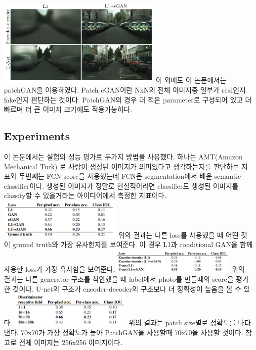 \documentclass[extendedabs]{bmvc2k}
\begin{document}
 \newline  \includegraphics[width=8cm]{images/01_pix2pix.PNG}
 \newline 이 외에도 이 논문에서는 patchGAN을 이용하였다. Patch cGAN이란
 NxN의 전체 이미지중 일부가 real인지 fake인지 판단하는 것이다. PatchGAN의 경우 더 적은 parameter로 구성되어 있고 더 빠르며 더 큰 이미지 크기에도 적용가능하다.
 
 \subsection{Experiments}
 \quad 이 논문에서는 실험의 성능 평가로 두가지 방법을 사용했다. 하나는 AMT(Amazon Mechanical Turk) 로 사람이 생성된 이미지가 의미있다고 생각하는지를 
 판단하는 지표와 두번째는 FCN-score을 사용했는데 FCN은 segmentation에서 배운 semantic classifier이다. 생성된 이미지가 정말로 현실적이라면 classifier도
 생성된 이미지를 classify할 수 있을거라는 아이디어에서 측정한 지표이다. 
 \newline  \includegraphics[width=6cm]{images/02_pix2pix.PNG}
 \newline 위의 결과는 다른 loss를 사용했을 때 어떤 것이 ground truth와 가장 유사한지를 보여준다. 이 경우 L1과 conditional GAN을 함께 사용한 loss가 가장 유사함을 보여준다.
 \newline  \includegraphics[width=6cm]{images/03_pix2pix.PNG}
 \newline 위의 결과는 다른 generator 구조를 착안했을 때 label에서 photo를 만들때의 score을 평가한 것이다. U-net의 구조가 encoder-decoder의 구조보다 더 정확성이 높음을 볼 수 있다.
 \newline  \includegraphics[width=6cm]{images/04_pix2pix.PNG}
 \newline 위의 결과는 patch size별로 정확도를 나타낸다. 70x70가 가장 정확도가 높아 PatchGAN을 사용할때 70x70을 사용할 것이다. 참고로 전체 이미지는 256x256 이미지이다. 
\end{document}
